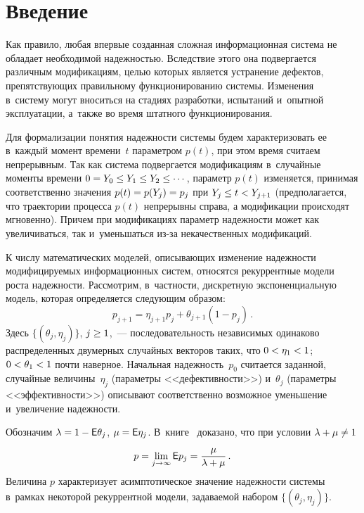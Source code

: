 
\thispagestyle{headings}

\begin{multicols}{2}

\label{st\stat}

\section{Введение}

Как правило, любая впервые созданная сложная информационная система 
не обладает необходимой надежностью. Вследствие этого она подвер\-гается различным 
модификациям, целью которых является устранение дефектов, препятствующих правильному 
функционированию системы. Изменения в~систему могут вноситься на стадиях разработки, 
испытаний и~опытной эксплуатации, а~так\-же во время штатного функционирования.

Для формализации понятия надежности системы будем характеризовать ее в~каждый момент 
времени~$t$ параметром $p(t)$, при этом время считаем непрерывным. Так как система 
подвергается модификациям в~случайные моменты времени $0\hm=Y_0\hm\le Y_1 \hm\le Y_2\hm
\le\cdots$, параметр $p(t)$ изменяется, принимая соответственно значения 
$p(t) \hm= p(Y_j) \hm= p_j$ при $Y_j\hm \le\hm t \hm<  Y_{j+1}$ (предполагается, 
что траектории процесса $p(t)$ непрерывны справа, а модификации происходят мгновенно). 
Причем при модификациях параметр надежности может как увеличиваться, так и~уменьшаться 
из-за некачественных модификаций.

К числу математических моделей, описыва\-ющих изменение надежности модифицируемых 
информационных систем, относятся рекуррентные модели роста надежности. 
Рассмотрим, в~частности, дискретную экспоненциальную модель, которая 
определяется следующим образом:
$$
p_{j+1} = \eta_{j+1}p_j + \theta_{j+1}(1-p_j)\,.
$$
Здесь $\{(\theta_j, \eta_j)\}$, $j\hm\ge1$,~--- последовательность независимых 
одинаково распределенных двумерных случайных векторов таких, что $0 \hm< \eta_1 \hm< 1$; 
$0 \hm< \theta_1  \hm< 1$ почти наверное. Начальная надежность~$p_0$ считается 
заданной, случайные величины~$\eta_j$ (параметры <<дефективности>>) и~$\theta_j$  
(параметры <<эффективности>>)  описывают соответственно возможное уменьшение 
и~увеличение надежности.

Обозначим $\lambda = 1 \hm- \e\theta_j$, $\mu \hm= \e\eta_j$.
В~книге~\cite{KS2006} доказано, что при условии $\lambda \hm+\mu\hm\neq1$
$$
p=\lim\limits_{j\to\infty}{\sf E} p_j = \displaystyle\frac{\displaystyle \mu\mathstrut}{\displaystyle \lambda+\mu\mathstrut}\,.
$$
Величина $p$ характеризует асимптотическое значение надежности системы в~рамках 
некоторой рекуррентной модели, задаваемой набором $\{(\theta_j, \eta_j)\}$.


\end{multicols}
